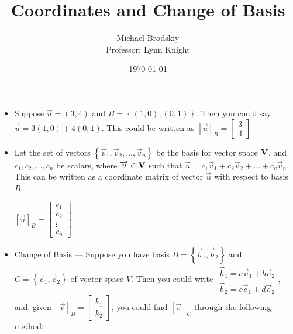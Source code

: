 \documentclass[12pt]{article}
\title{Coordinates and Change of Basis}
\date{\today}
\author{Michael Brodskiy\\ \small Professor: Lynn Knight}
\begin{document}
\maketitle

\begin{itemize}

  \item Suppose $\overrightarrow{u}=(3,4)$ and $B=\left\{ (1,0), (0,1) \right\}$. Then you could say $\overrightarrow{u}=3(1,0)+4(0,1)$. This could be written as $[\overrightarrow{u}]_B=\begin{bmatrix} 3\\ 4 \end{bmatrix}$

  \item Let the set of vectors $\left\{ \overrightarrow{v}_1,\overrightarrow{v}_2,\dots,\overrightarrow{v}_n \right\}$ be the basis for vector space $\bold{V}$, and $c_1,c_2,\dots,c_n$ be scalars, where $\overrightarrow{u} \in \bold{V}$ such that $\overrightarrow{u}=c_1\overrightarrow{v}_1+c_2\overrightarrow{v}_2+\dots+c_v\overrightarrow{v}_n$. This can be written as a coordinate matrix of vector $\overrightarrow{u}$ with respect to basis $B$:
    \begin{center}
      $[\overrightarrow{u}]_B=\begin{bmatrix} c_1\\c_2\\\vdots\\c_n\end{bmatrix}$
    \end{center}

  \item Change of Basis — Suppose you have basis $B=\left\{ \overrightarrow{b}_1, \overrightarrow{b}_2 \right\}$ and $C=\left\{ \overrightarrow{c}_1, \overrightarrow{c}_2 \right\}$ of vector space $V$. Then you could write $\begin{array}{c} \overrightarrow{b}_1=a\overrightarrow{c}_1+b\overrightarrow{c}_2\\ \overrightarrow{b}_2=c\overrightarrow{c}_1+d\overrightarrow{c}_2 \end{array}$, and, given $[\overrightarrow{v}]_B=\begin{bmatrix}k_1\\k_2\end{bmatrix}$, you could find $[\overrightarrow{v}]_C$ through the following method:


\end{itemize}
\end{document}
